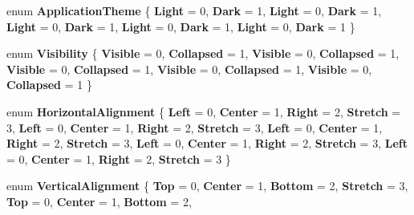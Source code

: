 \begin{DoxyCompactItemize}
enum {\bfseries Application\+Theme} \{ \newline
{\bfseries Light} = 0, 
{\bfseries Dark} = 1, 
{\bfseries Light} = 0, 
{\bfseries Dark} = 1, 
\newline
{\bfseries Light} = 0, 
{\bfseries Dark} = 1, 
{\bfseries Light} = 0, 
{\bfseries Dark} = 1, 
\newline
{\bfseries Light} = 0, 
{\bfseries Dark} = 1
 \}
\item 
\mbox{\label{namespace_windows_1_1_u_i_1_1_xaml_ab3fbc626243929a7adbc7f2170933135}} 
enum {\bfseries Visibility} \{ \newline
{\bfseries Visible} = 0, 
{\bfseries Collapsed} = 1, 
{\bfseries Visible} = 0, 
{\bfseries Collapsed} = 1, 
\newline
{\bfseries Visible} = 0, 
{\bfseries Collapsed} = 1, 
{\bfseries Visible} = 0, 
{\bfseries Collapsed} = 1, 
\newline
{\bfseries Visible} = 0, 
{\bfseries Collapsed} = 1
 \}
\item 
\mbox{\label{namespace_windows_1_1_u_i_1_1_xaml_a296d6e339e45f69b5f76a1183a51fef6}} 
enum {\bfseries Horizontal\+Alignment} \{ \newline
{\bfseries Left} = 0, 
{\bfseries Center} = 1, 
{\bfseries Right} = 2, 
{\bfseries Stretch} = 3, 
\newline
{\bfseries Left} = 0, 
{\bfseries Center} = 1, 
{\bfseries Right} = 2, 
{\bfseries Stretch} = 3, 
\newline
{\bfseries Left} = 0, 
{\bfseries Center} = 1, 
{\bfseries Right} = 2, 
{\bfseries Stretch} = 3, 
\newline
{\bfseries Left} = 0, 
{\bfseries Center} = 1, 
{\bfseries Right} = 2, 
{\bfseries Stretch} = 3, 
\newline
{\bfseries Left} = 0, 
{\bfseries Center} = 1, 
{\bfseries Right} = 2, 
{\bfseries Stretch} = 3
 \}
\item 
\mbox{\label{namespace_windows_1_1_u_i_1_1_xaml_adfb3c11d5572410fe610ae02feb31cd1}} 
enum {\bfseries Vertical\+Alignment} \{ \newline
{\bfseries Top} = 0, 
{\bfseries Center} = 1, 
{\bfseries Bottom} = 2, 
{\bfseries Stretch} = 3, 
\newline
{\bfseries Top} = 0, 
{\bfseries Center} = 1, 
{\bfseries Bottom} = 2, 

\end{DoxyCompactItemize}
